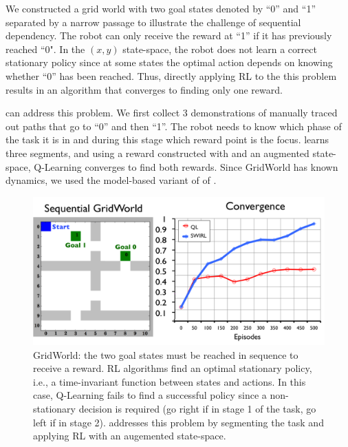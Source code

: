 We constructed a grid world with two goal states denoted by ``0'' and ``1'' separated by a narrow passage to illustrate the challenge of sequential dependency.
The robot can only receive the reward at ``1'' if it has previously reached ``0".
In the $(x,y)$ state-space, the robot does not learn a correct stationary policy since at some states the optimal action depends on knowing whether ``0'' has been reached.
Thus, directly applying RL to the this problem results in an algorithm that converges to finding only one reward.

\hirl can address this problem. We first collect 3 demonstrations of manually traced out paths that go to ``0'' and then ``1''.
The robot needs to know which phase of the task it is in and during this stage which reward point is the focus.
\hirl learns three segments, and using a reward constructed with \hirl and an augmented state-space, Q-Learning converges to find both rewards.
Since GridWorld has known dynamics, we used the model-based variant of of \hirl.

\begin{figure}[t]
\centering
 \includegraphics[width=0.8\columnwidth]{exp/wafr-gridword-1.png}
 \caption{GridWorld: the two goal states must be reached in sequence to receive a reward. RL algorithms find an optimal stationary policy, i.e., a time-invariant function between states and actions. In this case, Q-Learning fails to find a successful policy since a non-stationary decision is required (go right if in stage 1 of the task, go left if in stage 2). \hirl addresses this problem by segmenting the task and applying RL with an augemented state-space.\label{exp:gweasy1}}
\end{figure}
\fi

